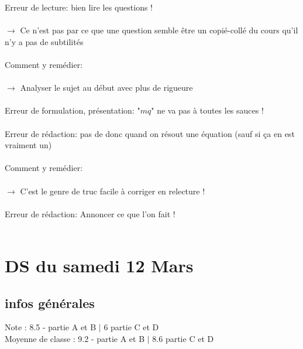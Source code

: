 \documentclass{book}
\begin{document}
Erreur de lecture: bien lire les questions ! \\ \\
$\rightarrow$ Ce n'est pas par ce que une question semble être un copié-collé du cours qu'il n'y a pas de subtilités \\ \\

Comment y remédier: \\ \\
$\rightarrow$ Analyser le sujet au début avec plus de rigueure \\ \\

Erreur de formulation, présentation: "$mq$" ne va pas à toutes les sauces ! \\ \\

Erreur de rédaction: pas de donc quand on résout une équation (sauf si ça en est vraiment un) \\ \\

Comment y remédier: \\ \\
$\rightarrow$ C'est le genre de truc facile à corriger en relecture ! \\ \\

Erreur de rédaction: Annoncer ce que l'on fait ! \\ \\





\section{DS du samedi 12 Mars}

\begin{tcolorbox}[width={14cm},colback={yellow!20!white},title={\textbf{Commentaire générale sur ce DM}},colbacktitle=red!40!white,coltitle=black]    

\end{tcolorbox}

\subsection{infos générales}

Note : 8.5 - partie A et B $|$ 6 partie C et D\\
Moyenne de classe : 9.2 - partie A et B $|$ 8.6 partie C et D \\
\end{document}
